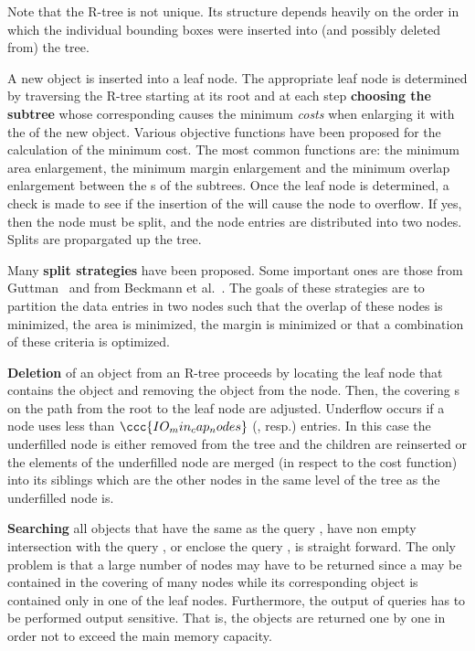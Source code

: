 Note that the R-tree is not unique. Its structure depends heavily
on the order in which the individual bounding boxes were inserted
into (and possibly deleted from) the tree.
 
A new object is inserted into a leaf node. The appropriate leaf
node  is determined by traversing the R-tree starting at its root
and at each step {\bf choosing the subtree} whose corresponding
 causes the minimum {\em costs} when enlarging it with
the  of the new object. Various objective functions have
been proposed for the calculation of the minimum cost. The most
common functions are: the minimum area enlargement, the minimum margin
enlargement and the minimum overlap enlargement between the s of the
subtrees. 
Once the leaf node is determined, a check is made to see if the
insertion of the  will cause the node to overflow. If
yes, then the node must be split, and the node entries are
distributed into two nodes. Splits are propargated
up the tree. 

Many {\bf split strategies} have been proposed. Some important ones are those from
Guttman~\cite{g-rtdis-84} and from Beckmann et
al.~\cite{bkss-rtera-90}.
The goals of these strategies are to  
 partition the data entries in two
nodes such that the overlap  of these nodes is minimized, the
area is minimized, the margin is minimized or that a combination of
these criteria is optimized.  

{\bf Deletion} of an object from an R-tree proceeds by locating the
leaf node that contains the object and removing the object from the node. Then, the
covering s on the path from the root to the leaf node
are adjusted. Underflow occurs if a
node uses less than $\ccc{IO_min_cap_nodes}$
(, resp.) entries. In this case the
underfilled node is either removed from the tree and the children
are reinserted or the elements of the underfilled node are merged
(in respect to the cost function) 
into its siblings which are the other nodes in the same level of the
tree as the underfilled node is. 

{\bf Searching} all objects that have the same  as the
query , have
non empty intersection with the query , or enclose the
query , is straight forward. The only problem is that
a large number of nodes may have to be returned since a 
may be contained in the covering  of many nodes while
its corresponding object is contained only in one of the leaf
nodes.
Furthermore, the output of queries has to be performed
output sensitive. That is, the objects
are returned one by one in order not to exceed the
main memory capacity.

